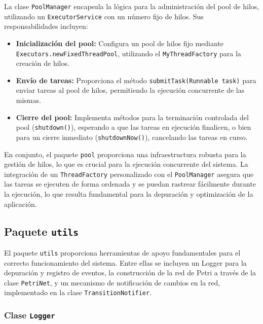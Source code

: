 \documentclass[12pt]{article}
\begin{document}
La clase \texttt{PoolManager} encapsula la lógica para la administración del pool de hilos, utilizando un \texttt{ExecutorService} con un número fijo de hilos. Sus responsabilidades incluyen:
\begin{itemize}
    \item \textbf{Inicialización del pool:} Configura un pool de hilos fijo mediante \texttt{Executors.newFixedThreadPool}, utilizando el \texttt{MyThreadFactory} para la creación de hilos.
    \item \textbf{Envío de tareas:} Proporciona el método \texttt{submitTask(Runnable task)} para enviar tareas al pool de hilos, permitiendo la ejecución concurrente de las mismas.
    \item \textbf{Cierre del pool:} Implementa métodos para la terminación controlada del pool (\texttt{shutdown()}), esperando a que las tareas en ejecución finalicen, o bien para un cierre inmediato (\texttt{shutdownNow()}), cancelando las tareas en curso.
\end{itemize}

En conjunto, el paquete \texttt{pool} proporciona una infraestructura robusta para la gestión de hilos, lo que es crucial para la ejecución concurrente del sistema. La integración de un \texttt{ThreadFactory} personalizado con el \texttt{PoolManager} asegura que las tareas se ejecuten de forma ordenada y se puedan rastrear fácilmente durante la ejecución, lo que resulta fundamental para la depuración y optimización de la aplicación.

\subsection{Paquete \texttt{utils}}

El paquete \texttt{utils} proporciona herramientas de apoyo fundamentales para el correcto funcionamiento del sistema. Entre ellas se incluyen un Logger para la depuración y registro de eventos, la construcción de la red de Petri a través de la clase \texttt{PetriNet}, y un mecanismo de notificación de cambios en la red, implementado en la clase \texttt{TransitionNotifier}.

\subsubsection{Clase \texttt{Logger}}
\end{document}
